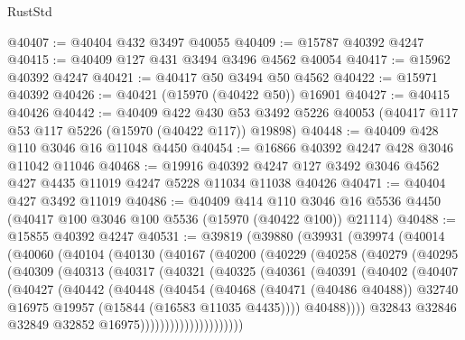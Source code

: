 \begin{lexlean}{RustStd}
\begin{coremodule}
@40407 := @40404 @432 @3497 @40055
@40409 := @15787 @40392 @4247
@40415 := @40409 @127 @431 @3494 @3496 @4562 @40054
@40417 := @15962 @40392 @4247
@40421 := @40417 @50 @3494 @50 @4562
@40422 := @15971 @40392
@40426 := @40421 (@15970 (@40422 @50)) @16901
@40427 := @40415 @40426
@40442 := @40409
    @422
    @430
    @53
    @3492
    @5226
    @40053
    (@40417 @117 @53 @117 @5226 (@15970 (@40422 @117)) @19898)
@40448 := @40409 @428 @110 @3046 @16 @11048 @4450
@40454 := @16866 @40392 @4247 @428 @3046 @11042 @11046
@40468 := @19916
    @40392
    @4247
    @127
    @3492
    @3046
    @4562
    @427
    @4435
    @11019
    @4247
    @5228
    @11034
    @11038
    @40426
@40471 := @40404 @427 @3492 @11019
@40486 := @40409
    @414
    @110
    @3046
    @16
    @5536
    @4450
    (@40417 @100 @3046 @100 @5536 (@15970 (@40422 @100)) @21114)
@40488 := @15855 @40392 @4247
@40531 := @39819
    (@39880
      (@39931
        (@39974
          (@40014
            (@40060
              (@40104
                (@40130
                  (@40167
                    (@40200
                      (@40229
                        (@40258
                          (@40279
                            (@40295
                              (@40309
                                (@40313
                                  (@40317
                                    (@40321
                                      (@40325
                                        (@40361
                                          (@40391
                                            (@40402
                                              (@40407
                                                (@40427
                                                  (@40442
                                                    (@40448
                                                      (@40454
                                                        (@40468
                                                          (@40471 (@40486 @40488))
                                                          @32740
                                                          @16975
                                                          @19957
                                                          (@15844 (@16583 @11035 @4435))))
                                                      @40488))))
                                              @32843
                                              @32846
                                              @32849
                                              @32852
                                              @16975)))))))))))))))))))))

\end{coremodule}
\end{lexlean}
